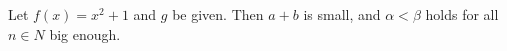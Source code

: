 \documentclass{article}
\begin{document}
Let $f(x) = x^2 + 1$ and $g$ be given. Then \(a+b\) is small,
and $\alpha < \beta$ holds for all $n \in N$ big enough.
\end{document}
